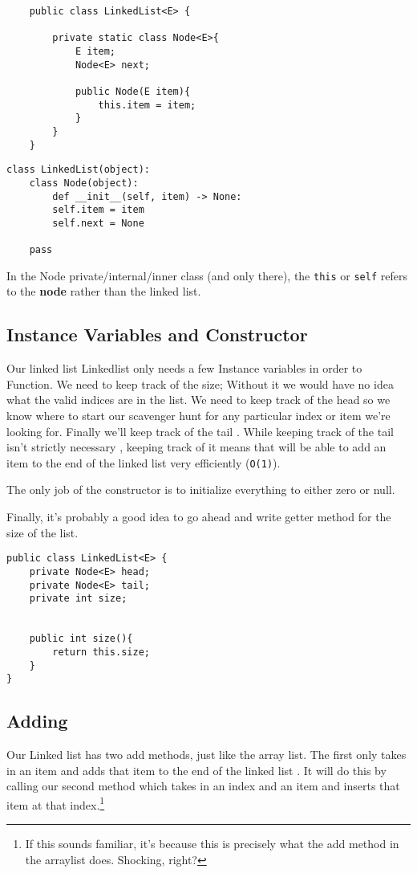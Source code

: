 \begin{verbatim}
	public class LinkedList<E> { 
		
		private static class Node<E>{
			E item;
			Node<E> next;
			
			public Node(E item){
				this.item = item;
			}
		}
	}
\end{verbatim}

\begin{verbatim}
class LinkedList(object):
	class Node(object):
		def __init__(self, item) -> None:
		self.item = item
		self.next = None

	pass
\end{verbatim}

In the Node private/internal/inner class (and only there), the \texttt{this} or \texttt{self} refers to the \textbf{node} rather than the linked list.





\subsection{Instance Variables and Constructor}

Our linked list Linkedlist only needs a few Instance  variables in order to Function. We need to keep track of the size; Without it we would have no idea what the valid indices are in the list. We need to keep track of the head so we know where to start our scavenger hunt for any particular index or item we're looking for.  Finally we'll keep track of the tail . While keeping track of the tail isn't strictly necessary , keeping track of it means that will be able to add an item to the end of the linked list very efficiently (\texttt{O(1)}).

The only job of the constructor is to initialize everything to either zero or null.

Finally, it's probably a good idea to go ahead and write getter method for the size of the list.

\begin{verbatim}
public class LinkedList<E> { 
	private Node<E> head;
	private Node<E> tail;
	private int size;
	
	
	public int size(){
		return this.size;
	}
}
\end{verbatim}






\subsection{Adding}
Our Linked list has two add methods, just like the array list.  The first only takes in an item and adds that item to the end of the linked list . It will do this by calling our second method which takes in an index and an item and inserts that item at that index.\footnote{If this sounds familiar, it's because this is precisely what the add method in the arraylist does. Shocking, right?}

